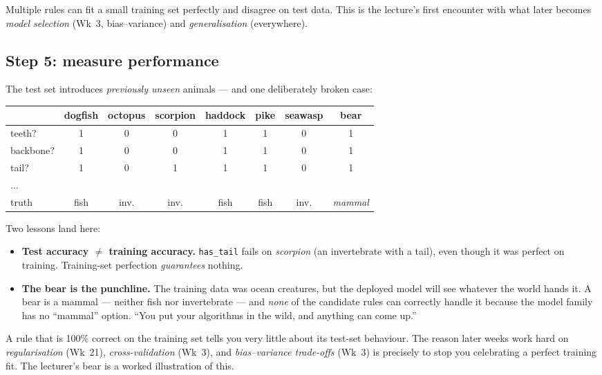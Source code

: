 \documentclass[11pt, a4paper]{article}
\begin{document}
Multiple rules can fit a small training set perfectly and disagree on test data. This is the lecture's first encounter with what later becomes \emph{model selection} (Wk~3, bias--variance) and \emph{generalisation} (everywhere).

\subsection{Step 5: measure performance}

The test set introduces \emph{previously unseen} animals — and one deliberately broken case:

\begin{center}
\small
\begin{tabular}{l ccccccc}
\toprule
& dogfish & octopus & scorpion & haddock & pike & seawasp & \textbf{bear} \\
\midrule
teeth?    & 1 & 0 & 0 & 1 & 1 & 0 & 1 \\
backbone? & 1 & 0 & 0 & 1 & 1 & 0 & 1 \\
tail?     & 1 & 0 & 1 & 1 & 1 & 0 & 1 \\
$\ldots$ & & & & & & & \\
\midrule
truth & fish & inv. & inv. & fish & fish & inv. & \emph{mammal} \\
\bottomrule
\end{tabular}
\end{center}

Two lessons land here:

\begin{itemize}
  \item \textbf{Test accuracy $\neq$ training accuracy.} \texttt{has\_tail} fails on \emph{scorpion} (an invertebrate with a tail), even though it was perfect on training. Training-set perfection \emph{guarantees} nothing.
  \item \textbf{The bear is the punchline.} The training data was ocean creatures, but the deployed model will see whatever the world hands it. A bear is a mammal — neither fish nor invertebrate — and \emph{none} of the candidate rules can correctly handle it because the model family has no ``mammal'' option. ``You put your algorithms in the wild, and anything can come up.''
\end{itemize}

\begin{pitfallbox}
A rule that is 100\% correct on the training set tells you very little about its test-set behaviour. The reason later weeks work hard on \emph{regularisation} (Wk~21), \emph{cross-validation} (Wk~3), and \emph{bias--variance trade-offs} (Wk~3) is precisely to stop you celebrating a perfect training fit. The lecturer's bear is a worked illustration of this.
\end{pitfallbox}
\end{document}
